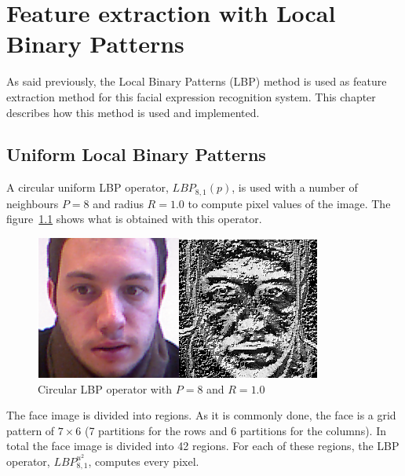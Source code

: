 \chapter{Feature extraction with Local Binary Patterns}
\label{chap:implementation_lbp}

\noindent As said previously, the Local Binary Patterns (LBP) method is used as feature extraction method for this facial expression recognition system. This chapter describes how this method is used and implemented.
\newline

\section{Uniform Local Binary Patterns}

\vspace{\baselineskip}
\noindent A circular uniform LBP operator, $ LBP_{8,1}(p) $, is used with a number of neighbours $ P = 8 $ and radius $ R = 1.0 $ to compute pixel values of the image. The figure~\ref{lbp_implementation_example} shows what is obtained with this operator. 
\newline

\begin{figure}[!h]
\begin{center}
\noindent \includegraphics[scale=0.7]{figures/lbp_implementation_example} 
\newline
\caption{Circular LBP operator with $ P = 8 $ and $ R = 1.0 $}
\label{lbp_implementation_example}
\end{center} 
\end{figure}

\noindent The face image is divided into regions. As it is commonly done, the face is a grid pattern of $ 7\times6 $ (7 partitions for the rows and 6 partitions for the columns). In total the face image is divided into 42 regions. For each of these regions, the LBP operator, $ LBP_{8,1}^{u^2} $, computes every pixel.
\newline

